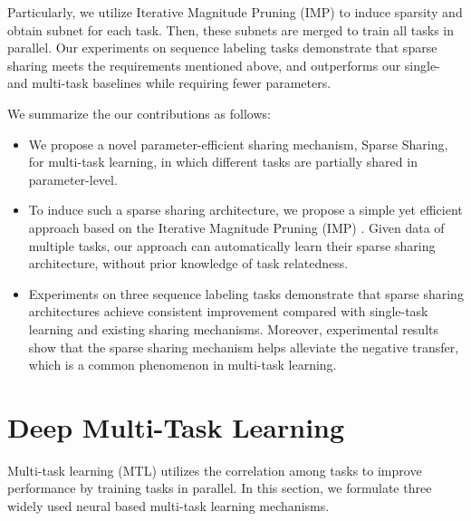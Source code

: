 \documentclass[letterpaper]{article} %
\begin{document}
Particularly, we utilize Iterative Magnitude Pruning (IMP) \cite{DBLP:conf/iclr/FrankleC19} to induce sparsity and obtain subnet for each task. Then, these subnets are merged to train all tasks in parallel. Our experiments on sequence labeling tasks demonstrate that sparse sharing meets the requirements mentioned above, and outperforms our single- and multi-task baselines while requiring fewer parameters.

We summarize the our contributions as follows:
\begin{itemize}
    \item We propose a novel parameter-efficient sharing mechanism, Sparse Sharing, for multi-task learning, in which different tasks are partially shared in parameter-level.

    \item To induce such a sparse sharing architecture, we propose a simple yet efficient approach based on the Iterative Magnitude Pruning (IMP) \cite{DBLP:conf/iclr/FrankleC19}. Given data of multiple tasks, our approach can automatically learn their sparse sharing architecture, without prior knowledge of task relatedness.

    \item Experiments on three sequence labeling tasks demonstrate that sparse sharing architectures achieve consistent improvement compared with single-task learning and existing sharing mechanisms. Moreover, experimental results show that the sparse sharing mechanism helps alleviate the negative transfer, which is a common phenomenon in multi-task learning.
\end{itemize}

\section{Deep Multi-Task Learning}
Multi-task learning (MTL) utilizes the correlation among tasks to improve performance by training tasks in parallel. In this section, we formulate three widely used neural based multi-task learning mechanisms.
\end{document}
